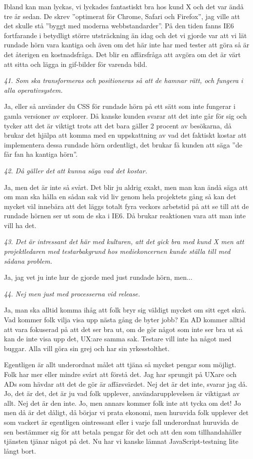\documentclass[11pt]{article}
\begin{document}
Ibland kan man lyckas, vi lyckades fantastiskt bra hos kund X och det var ändå tre år sedan. De skrev ”optimerat för Chrome, Safari och Firefox”, jag ville att det skulle stå ”byggt med moderna webbstandarder”. På den tiden fanns IE6 fortfarande i betydligt större utsträckning än idag och det vi gjorde var att vi lät rundade hörn vara kantiga och även om det här inte har med tester att göra så är det återigen en kostnadsfråga. Det blir en affärsfråga att avgöra om det är värt att sitta och lägga in gif-bilder för varenda bild.

\emph{41. Som ska transformeras och positioneras så att de hamnar rätt, och fungera i alla operativsystem.}

Ja, eller så använder du CSS för rundade hörn på ett sätt som inte fungerar i gamla versioner av explorer. Då kanske kunden svarar att det inte går för sig och tycker att det är viktigt trots att det bara gäller 2 procent av besökarna, då brukar det hjälpa att komma med en uppskattning av vad det faktiskt kostar att implementera dessa rundade hörn ordentligt, det brukar få kunden att säga ”de får fan ha kantiga hörn”.

\emph{42. Då gäller det att kunna säga vad det kostar.}

Ja, men det är inte så svårt. Det blir ju aldrig exakt, men man kan ändå säga att om man ska hålla en sådan sak vid liv genom hela projektets gång så kan det mycket väl innebära att det läggs totalt fyra veckors arbetstid på att se till att de rundade hörnen ser ut som de ska i IE6. Då brukar reaktionen vara att man inte vill ha det.

\emph{43. Det är intressant det här med kulturen, att det gick bra med kund X men att projektledaren med testarbakgrund hos mediekoncernen kunde ställa till med sådana problem.}

Ja, jag vet ju inte hur de gjorde med just rundade hörn, men...

\emph{44. Nej men just med processerna vid release.}

Ja, man ska alltid komma ihåg att folk bryr sig väldigt mycket om sitt eget skrå. Vad kommer folk vilja visa upp nästa gång de byter jobb? En AD kommer alltid att vara fokuserad på att det ser bra ut, om de gör något som inte ser bra ut så kan de inte visa upp det, UX:are samma sak. Testare vill inte ha något med buggar. Alla vill göra sin grej och har sin yrkesstolthet.

Egentligen är allt underordnat målet att tjäna så mycket pengar som möjligt. Folk har mer eller mindre svårt att förstå det. Jag har sprungit på UXare och ADs som hävdar att det de gör är affärsvärdet. Nej det är det inte, svarar jag då. Jo, det är det, det är ju vad folk upplever, användarupplevelsen är viktigast av allt. Nej det är den inte. Jo, men annars kommer folk inte att tycka om det! Jo men då är det dåligt, då börjar vi prata ekonomi, men huruvida folk upplever det som vackert är egentligen ointressant eller i varje fall underordnat huruvida de sen bestämmer sig för att betala pengar för det och att den som tillhandahåller tjänsten tjänar något på det. Nu har vi kanske lämnat JavaScript-testning lite långt bort.
\end{document}
